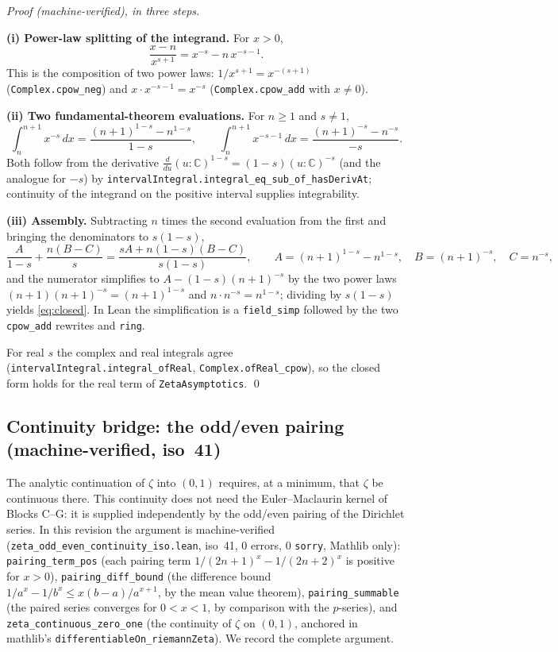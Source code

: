\documentclass{article}
\newcommand{\C}{\mathbb{C}}
\newcommand{\zt}{\zeta}
\begin{document}
\emph{Proof (machine-verified), in three steps.}

\textbf{(i) Power-law splitting of the integrand.} For $x>0$,
\[
\frac{x-n}{x^{s+1}}=x^{-s}-n\,x^{-s-1}.
\]
This is the composition of two power laws: $1/x^{s+1}=x^{-(s+1)}$
(\texttt{Complex.cpow\_neg}) and $x\cdot x^{-s-1}=x^{-s}$
(\texttt{Complex.cpow\_add} with $x\neq 0$).

\textbf{(ii) Two fundamental-theorem evaluations.} For $n\ge 1$ and
$s\neq 1$,
\[
\int_n^{n+1}x^{-s}\,dx=\frac{(n+1)^{1-s}-n^{1-s}}{1-s},
\qquad
\int_n^{n+1}x^{-s-1}\,dx=\frac{(n+1)^{-s}-n^{-s}}{-s}.
\]
Both follow from the derivative
$\frac{d}{du}(u:\C)^{1-s}=(1-s)(u:\C)^{-s}$ (and the analogue for
$-s$) by \texttt{intervalIntegral.integral\_eq\_sub\_of\_hasDerivAt};
continuity of the integrand on the positive interval supplies
integrability.

\textbf{(iii) Assembly.} Subtracting $n$ times the second evaluation from
the first and bringing the denominators to $s(1-s)$,
\[
\frac{A}{1-s}+\frac{n(B-C)}{s}=\frac{sA+n(1-s)(B-C)}{s(1-s)},
\qquad
A=(n+1)^{1-s}-n^{1-s},\quad B=(n+1)^{-s},\quad C=n^{-s},
\]
and the numerator simplifies to $A-(1-s)(n+1)^{-s}$ by the two power laws
$(n+1)(n+1)^{-s}=(n+1)^{1-s}$ and $n\cdot n^{-s}=n^{1-s}$; dividing by
$s(1-s)$ yields \eqref{eq:closed}. In Lean the simplification is a
\texttt{field\_simp} followed by the two \texttt{cpow\_add} rewrites and
\texttt{ring}.

For real $s$ the complex and real integrals agree
(\texttt{intervalIntegral.integral\_ofReal},
\texttt{Complex.ofReal\_cpow}), so the closed form holds for the real term
of \texttt{ZetaAsymptotics}.
\qed

\subsection{Continuity bridge: the odd/even pairing (machine-verified, iso~41)}
\label{sec:contbridge}

The analytic continuation of $\zt$ into $(0,1)$ requires, at a minimum, that
$\zt$ be continuous there. This continuity does not need the
Euler--Maclaurin kernel of Blocks C--G: it is supplied independently by the
odd/even pairing of the Dirichlet series. In this revision the argument is
machine-verified (\texttt{zeta\_odd\_even\_continuity\_iso.lean}, iso~41,
0 errors, 0 \texttt{sorry}, Mathlib only): \texttt{pairing\_term\_pos}
(each pairing term $1/(2n+1)^x-1/(2n+2)^x$ is positive for $x>0$),
\texttt{pairing\_diff\_bound} (the difference bound
$1/a^x-1/b^x\le x(b-a)/a^{x+1}$, by the mean value theorem),
\texttt{pairing\_summable} (the paired series converges for $0<x<1$, by
comparison with the $p$-series), and \texttt{zeta\_continuous\_zero\_one}
(the continuity of $\zt$ on $(0,1)$, anchored in mathlib's
\texttt{differentiableOn\_riemannZeta}). We record the complete argument.
\end{document}
